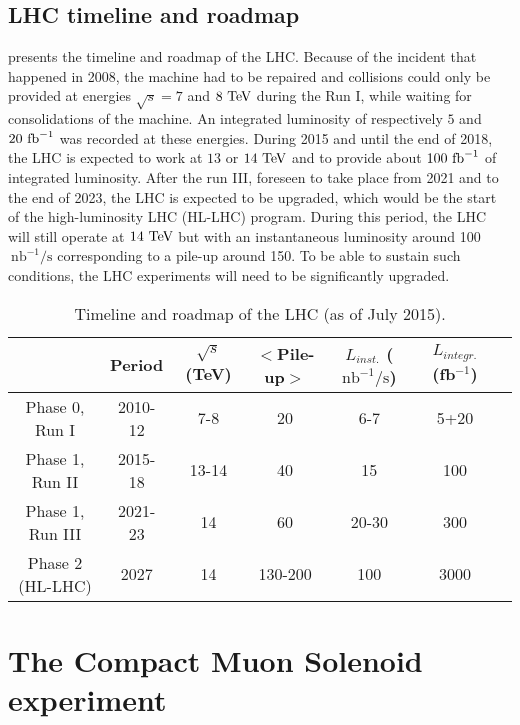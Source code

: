    \subsection{LHC timeline and roadmap}

     presents the timeline and roadmap of the LHC. Because of the
    incident that happened in 2008, the machine had to be repaired and collisions could
    only be provided at energies $\sqrt{s} = 7$ and $8~\text{TeV}$ during the Run I, while waiting for consolidations
    of the machine. An integrated luminosity of respectively $5$ and $20~\text{fb}^{-1}$ was recorded
    at these energies. During 2015 and until the end of 2018, the LHC is expected to work
    at $13$ or $14~\text{TeV}$ and to provide about $100~\text{fb}^{-1}$ of integrated luminosity. After
    the run III, foreseen to take place from 2021 and to the end of 2023, the LHC is expected to be upgraded,
    which would be the start of the high-luminosity LHC (HL-LHC) program. During this period,
    the LHC will still operate at $14~\text{TeV}$ but with an instantaneous luminosity around
    100$~\text{nb}^{-1} / \text{s}$ corresponding to a pile-up around 150. To be able to
    sustain such conditions, the LHC experiments will need to be significantly upgraded.

    \begin{table}[h]
        \begin{tabular}{|c|c|c|c|c|c|c|}
            \hline
            & Period
            & $\sqrt{s}$ (TeV)
            & $<$Pile-up$>$
            & $L_{inst.}$ ($\text{nb}^{-1} / \text{s}$)
            & $L_{integr.}$ (fb$^{-1}$) \\
            \hline
            Phase 0, Run I    & 2010-12 & 7-8   & 20      & 6-7   & 5+20\\
            \hline
            \hline
            Phase 1, Run II   & 2015-18 & 13-14 & 40      & 15    & 100\\
            Phase 1, Run III  & 2021-23 & 14    & 60      & 20-30 & 300\\
            \hline
            \hline
            Phase 2 (HL-LHC)  & 2027    & 14    & 130-200 & 100   & 3000\\
            \hline
        \end{tabular}
        \caption{Timeline and roadmap of the LHC (as of July 2015).\label{tab:LHCtimeline}}
    \end{table}

    \section{The Compact Muon Solenoid experiment \label{sec:CMSexperiment}}

